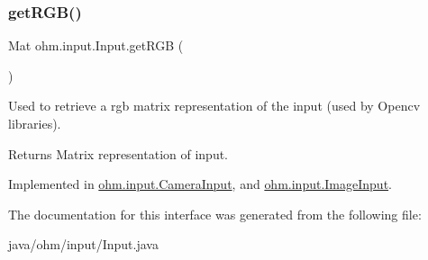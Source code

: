 \subsubsection{\texorpdfstring{get\+R\+G\+B()}{getRGB()}}
{\footnotesize\ttfamily Mat ohm.\+input.\+Input.\+get\+R\+GB (\begin{DoxyParamCaption}{ }\end{DoxyParamCaption})}

Used to retrieve a rgb matrix representation of the input (used by Opencv libraries). \begin{DoxyReturn}{Returns}
Matrix representation of input. 
\end{DoxyReturn}


Implemented in \hyperlink{classohm_1_1input_1_1_camera_input_ad237c282f6c3367ef857d12ebb079b38}{ohm.\+input.\+Camera\+Input}, and \hyperlink{classohm_1_1input_1_1_image_input_aad0a18c0396fba14d5e1d74c08a592e6}{ohm.\+input.\+Image\+Input}.



The documentation for this interface was generated from the following file\+:\begin{DoxyCompactItemize}
\item 
java/ohm/input/Input.\+java\end{DoxyCompactItemize}
